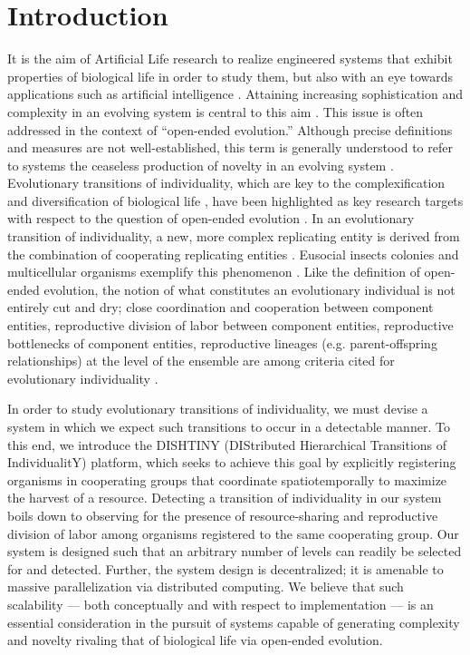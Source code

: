 \section{Introduction}

It is the aim of Artificial Life research to realize engineered systems that exhibit properties of biological life in order to study them, but also with an eye towards applications such as artificial intelligence \citep{bedau2003artificial}.
Attaining increasing sophistication and complexity in an evolving system is central to this aim \citep{goldsby2017increasing}.
This issue is often addressed in the context of ``open-ended evolution.''
Although precise definitions and measures are not well-established, this term is generally understood to refer to systems the ceaseless production of novelty in an evolving system \citep{taylor2016open}.
Evolutionary transitions of individuality, which are key to the complexification and diversification of biological life \citep{smith1997major}, have been highlighted as key research targets with respect to the question of open-ended evolution \citep{ray1996evolving, banzhaf2016defining}.
In an evolutionary transition of individuality, a new, more complex replicating entity is derived from the combination of cooperating replicating entities \citep{west2015major}.
Eusocial insects colonies and multicellular organisms exemplify this phenomenon \cite{smith1997major}.
Like the definition of open-ended evolution, the notion of what constitutes an evolutionary individual is not entirely cut and dry; close coordination and cooperation between component entities, reproductive division of labor between component entities, reproductive bottlenecks of component entities, reproductive lineages (e.g. parent-offspring relationships) at the level of the ensemble are among criteria cited for evolutionary individuality
\citep{ereshefsky2015rethinking, bouchard2013symbiotic}.

In order to study evolutionary transitions of individuality, we must devise a system in which we expect such transitions to occur in a detectable manner.
To this end, we introduce the DISHTINY (DIStributed Hierarchical Transitions of IndividualitY) platform, which seeks to achieve this goal by explicitly registering organisms in cooperating groups that coordinate spatiotemporally to maximize the harvest of a resource.
Detecting a transition of individuality in our system boils down to observing for the presence of resource-sharing and reproductive division of labor among organisms registered to the same cooperating group.
Our system is designed such that an arbitrary number of levels can readily be selected for and detected.
Further, the system design is decentralized; it is amenable to massive parallelization via distributed computing.
We believe that such scalability ---  both conceptually and with respect to implementation --- is an essential consideration in the pursuit of systems capable of generating complexity and novelty rivaling that of biological life via open-ended evolution.

